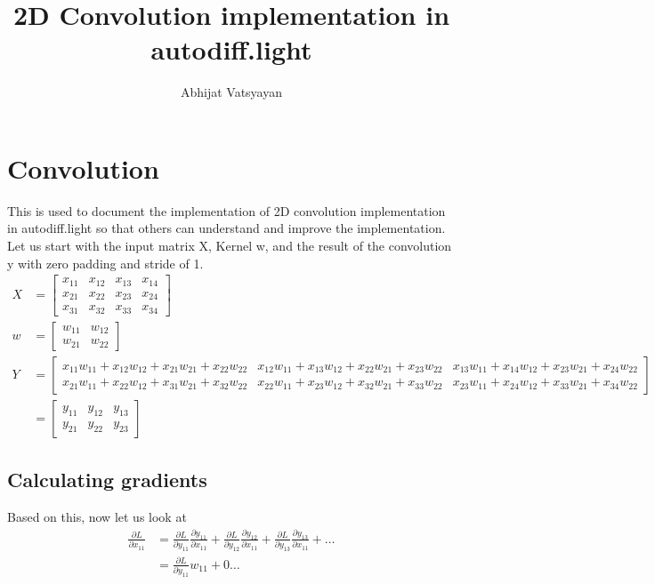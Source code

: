 \documentclass[10pt]{article} %
\title{2D Convolution implementation in autodiff.light}
\author{Abhijat Vatsyayan}
\date{}
\begin{document}
\setcounter{secnumdepth}{5}
\maketitle
\tableofcontents
\section{Convolution}
This is used to document the implementation of 2D convolution implementation in 
autodiff.light so that others can understand and improve the implementation. Let us start 
with the  input matrix X, Kernel w,  and the result of the convolution y with zero padding 
and stride of 1. 
\begin{equation*} 
\begin{aligned}
X &= 
	\begin{bmatrix}
	x_{11} & x_{12} & x_{13} & x_{14} \\
	x_{21} & x_{22} & x_{23} & x_{24} \\
	x_{31} & x_{32} & x_{33} & x_{34}
	\end{bmatrix}  
\\
w &= 
	\begin{bmatrix}
	w_{11} & w_{12} \\
	w_{21} & w_{22} 
	\end{bmatrix} 
\\
Y & = 
\begin{bmatrix}
	x_{11}w_{11}  + x_{12}w_{12}  + x_{21}w_{21}  + x_{22}w_{22} & 
	x_{12}w_{11}  + x_{13}w_{12}  + x_{22}w_{21}  + x_{23}w_{22} & 
	x_{13}w_{11}  + x_{14}w_{12}  + x_{23}w_{21}  + x_{24}w_{22} \\
	x_{21}w_{11}  + x_{22}w_{12}  + x_{31}w_{21}  + x_{32}w_{22} & 
	x_{22}w_{11}  + x_{23}w_{12}  + x_{32}w_{21}  + x_{33}w_{22} & 
	x_{23}w_{11}  + x_{24}w_{12}  + x_{33}w_{21}  + x_{34}w_{22} 
\end{bmatrix}  
\\
 & = 
 \begin{bmatrix}
	y_{11} & y_{12} & y_{13} \\
	y_{21} & y_{22} & y_{23} 
 \end{bmatrix}
\end{aligned} 
\end{equation*} 

\subsection{Calculating gradients}
Based on this, now let us look at 
\begin{equation*}
\begin{split}
\frac{\partial L}{\partial x_{11}} & = \frac{\partial L}{\partial y_{11}} \frac{\partial y_{11}}{\partial x_{11}} 
+ \frac{\partial L}{\partial y_{12}} \frac{\partial y_{12}}{\partial x_{11}} 
+ \frac{\partial L}{\partial y_{13}} \frac{\partial y_{13}}{\partial x_{11}} +\dots \\
  & = \frac{\partial L}{\partial y_{11}} w_{11} +0 \dots 
\end{split} 
\end{equation*}
\end{document}
